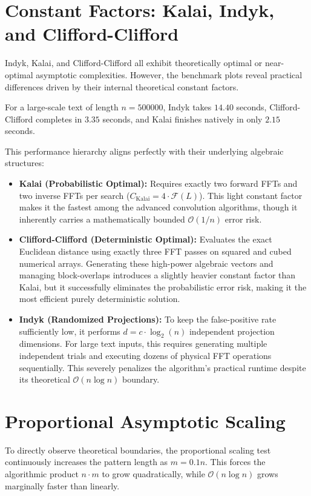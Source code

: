 \section{Constant Factors: Kalai, Indyk, and Clifford-Clifford}
Indyk, Kalai, and Clifford-Clifford all exhibit theoretically optimal or near-optimal asymptotic complexities. However, the benchmark plots reveal practical differences driven by their internal theoretical constant factors. 

For a large-scale text of length $n=500000$, Indyk takes $14.40$ seconds, Clifford-Clifford completes in $3.35$ seconds, and Kalai finishes natively in only $2.15$ seconds. 

This performance hierarchy aligns perfectly with their underlying algebraic structures:
\begin{itemize}
    \item \textbf{Kalai (Probabilistic Optimal):} Requires exactly two forward FFTs and two inverse FFTs per search ($C_{\text{Kalai}} = 4 \cdot \mathcal{F}(L)$). This light constant factor makes it the fastest among the advanced convolution algorithms, though it inherently carries a mathematically bounded $\mathcal{O}(1/n)$ error risk.
    \item \textbf{Clifford-Clifford (Deterministic Optimal):} Evaluates the exact Euclidean distance using exactly three FFT passes on squared and cubed numerical arrays. Generating these high-power algebraic vectors and managing block-overlaps introduces a slightly heavier constant factor than Kalai, but it successfully eliminates the probabilistic error risk, making it the most efficient purely deterministic solution.
    \item \textbf{Indyk (Randomized Projections):} To keep the false-positive rate sufficiently low, it performs $d = c \cdot \log_2(n)$ independent projection dimensions. For large text inputs, this requires generating multiple independent trials and executing dozens of physical FFT operations sequentially. This severely penalizes the algorithm's practical runtime despite its theoretical $\mathcal{O}(n \log n)$ boundary.
\end{itemize}

\section{Proportional Asymptotic Scaling}
To directly observe theoretical boundaries, the proportional scaling test continuously increases the pattern length as $m = 0.1n$. This forces the algorithmic product $n \cdot m$ to grow quadratically, while $\mathcal{O}(n \log n)$ grows marginally faster than linearly. 

